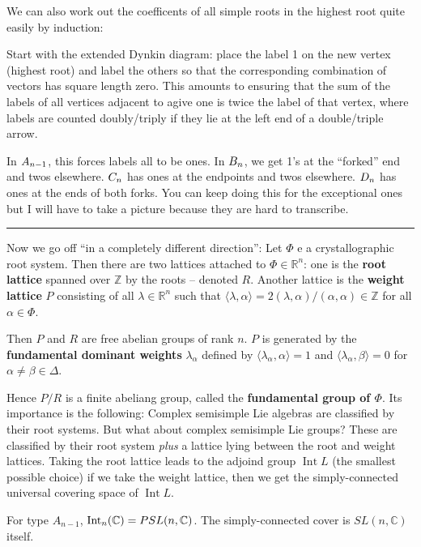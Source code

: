 \documentclass[12pt]{article}
\theoremstyle{nonumberbreak}
\theoremstyle{changebreak}
\theoremstyle{nonumberbreak}
\theoremstyle{change}
\newcommand*{\Z}{
\mathbb{Z}
}
\newcommand*{\R}{
\mathbb{R}
}
\newcommand*{\C}{
\mathbb{C}
}
\newcommand*{\brk}{
\rule{2in}{.1pt}
}
\let\sl\relax
\DeclareMathOperator{\sl}{\mathfrak{sl}}
\DeclareMathOperator{\Int}{Int}
\let\tilde\relax
\newcommand*{\tilde}[1]{\widetilde{#1}}
\begin{document}
We can also work out the coefficents of all simple roots in the highest root quite easily by induction:

Start with the extended Dynkin diagram: place the label 1 on the new vertex (highest root) and label
the others so that the corresponding combination of vectors has square length zero. This amounts to ensuring
that the sum of the labels of all vertices adjacent to agive one is twice the label of that vertex, where labels are counted doubly/triply
if they lie at the left end of a double/triple arrow.

In $\tilde A_{n-1}$, this forces labels all to be ones. In $\tilde B_n$, we get 1's at the ``forked'' end 
and twos elsewhere. $\tilde C_n$ has ones at the endpoints and twos elsewhere. $\tilde D_n$ has ones at the ends of both forks.
You can keep doing this for the exceptional ones but I will have to take a picture because they are hard to transcribe.

\brk

Now we go off ``in a completely different direction'': Let $\Phi$ e a crystallographic root system. Then there are two lattices attached to $\Phi\in\R^n$:
one is the \textbf{root lattice} spanned over $\Z$ by the roots -- denoted $R$. Another lattice is the \textbf{weight lattice} $P$
consisting of all $\lambda\in\R^n$ such that $\langle\lambda,\alpha\rangle=2(\lambda,\alpha)/(\alpha,\alpha)\in\Z$ for all $\alpha\in\Phi$.

Then $P$ and $R$ are free abelian groups of rank $n$. $P$ is generated by the \textbf{fundamental dominant weights} $\lambda_\alpha$
defined by $\langle\lambda_\alpha,\alpha\rangle = 1$ and $\langle\lambda_\alpha,\beta\rangle=0$
for $\alpha\ne\beta\in\Delta$.

Hence $P/R$ is a finite abeliang group, called the \textbf{fundamental group of $\Phi$}. Its importance is the following:
Complex semisimple Lie algebras are classified by their root systems. But what about complex semisimple Lie groups?
These are classified by their root system \textit{plus} a lattice lying between the root and weight lattices. Taking the root lattice 
leads to the adjoind group $\Int L$ (the smallest possible choice) if we take the weight lattice, then we get the simply-connected 
universal covering space of $\Int L$.

\begin{ex}
	For type $A_{n-1}$, $\Int \sl_n(\C)=PSL(n,\C)$. The simply-connected cover is $SL(n,\C)$ itself.
\end{ex}
\end{document}
